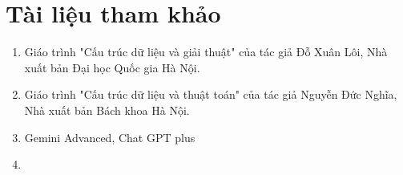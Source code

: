 \section*{Tài liệu tham khảo}
\thispagestyle{empty}
\begin{enumerate}
    \item Giáo trình "Cấu trúc dữ liệu và giải thuật" của tác giả Đỗ Xuân Lôi, Nhà xuất bản Đại học Quốc gia Hà Nội.
    \item Giáo trình "Cấu trúc dữ liệu và thuật toán" của tác giả Nguyễn Đức Nghĩa, Nhà xuất bản Bách khoa Hà Nội.
    \item Gemini Advanced, Chat GPT plus
    \item 
\end{enumerate}